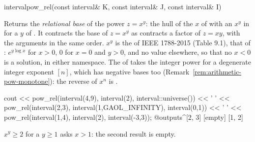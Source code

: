 \documentclass[12pt,a4paper,twoside,openright]{book}
\begin{document}
\begin{deffun}{interval}{pow\_rel}{(const interval\& K, const interval\& J, const interval\& I)}
  \begin{operation}
  \end{operation}
  Returns the \emph{relational base} of the power $z=x^y$: the hull of the
  $x$ of  with an $x^y$ in  for a $y$ of . It contracts
  the base of $z=x^y$ as  contracts a factor of
  $z=xy$, with the arguments in the same order.\newinvfive{} $x^y$ is the
   of IEEE 1788-2015 (Table 9.1), that of
  : $e^{y\log x}$ for $x>0$, $0$ for $x=0$ and
  $y>0$, and no value elsewhere, so that no $x<0$ is a solution, in either
  namespace. The  of  takes the integer power for a
  degenerate integer exponent $[n]$, which has negative bases too
  (Remark~\ref{rem:arithmetic-pow-monotone}): the reverse of $x^n$ is
  .
\begin{example}
cout << pow_rel(interval(4,9), interval(2), interval::universe()) << ' '
     << pow_rel(interval(2,3), interval(1,GAOL_INFINITY), interval(0,1)) << ' '
     << pow_rel(interval(1,4), interval(2), interval(-3,3));
@outputs^[2, 3] [empty] [1, 2]~
\end{example}
  $x^y\geq2$ for a $y\geq1$ asks $x>1$: the second result is empty.
\end{deffun}
\end{document}
